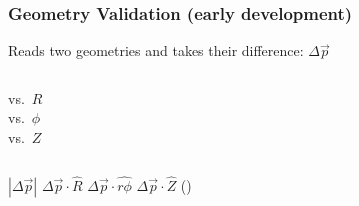 \documentclass[compress]{beamer}
\begin{document}
\begin{frame}
\frametitle{Geometry Validation (early development)}

Reads two geometries and takes their difference: $\Delta \vec{p}$

\vfill

\begin{columns}
vs.\ $R$ \\

\vspace{1.5 cm}
vs.\ $\phi$ \\

\vspace{1.5 cm}
vs.\ $Z$ \\
\end{columns}

\vfill \small \hspace{0.7 cm} $|\Delta \vec{p}|$ \hspace{0.8 cm} $\Delta \vec{p}\cdot\hat{R}$ \hspace{0.8 cm} $\Delta \vec{p}\cdot\hat{r\phi}$ \hspace{0.8 cm} $\Delta \vec{p}\cdot\hat{Z}$ \hfill ()
\end{frame}
\end{document}
